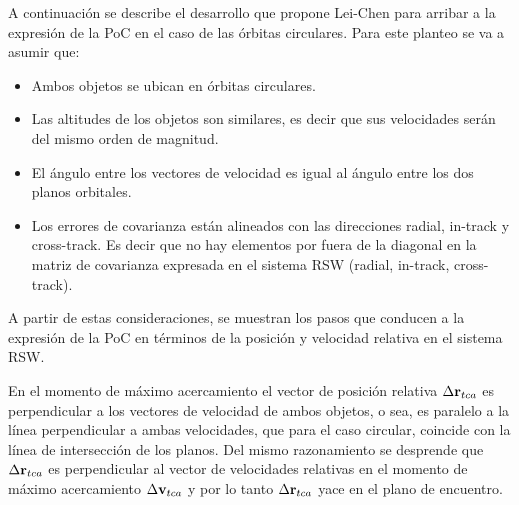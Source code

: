 A continuaci\'on se describe el desarrollo que propone Lei-Chen para arribar a la expresi\'on de la PoC en el caso de las \'orbitas circulares. Para este planteo se va a asumir que:

\begin{itemize}
 \item Ambos objetos se ubican en \'orbitas circulares.
 \item Las altitudes de los objetos son similares, es decir que sus velocidades ser\'an del mismo orden de magnitud.
 \item El \'angulo entre los vectores de velocidad es igual al \'angulo entre los dos planos orbitales.
 \item Los errores de covarianza est\'an alineados con las direcciones radial, in-track y cross-track. Es decir que no hay elementos por fuera de la diagonal en la matriz de covarianza expresada en el sistema RSW (radial, in-track, cross-track).
\end{itemize}

A partir de estas consideraciones, se muestran los pasos que conducen a la expresi\'on de la PoC en t\'erminos de la posici\'on y velocidad relativa en el sistema RSW. 
 
En el momento de m\'aximo acercamiento el vector de posici\'on relativa $\Delta {\bf{r}}_{tca}$ es perpendicular a los vectores de velocidad de ambos objetos, o sea, es paralelo a la l\'inea perpendicular a ambas velocidades, que para el caso circular, coincide con la l\'inea de intersecci\'on de los planos. Del mismo razonamiento se desprende que $\Delta {\bf{r}}_{tca}$ es perpendicular al vector de velocidades relativas en el momento de m\'aximo acercamiento $\Delta {\bf{v}}_{tca}$ y por lo tanto $\Delta {\bf{r}}_{tca}$ yace en el plano de encuentro. 


